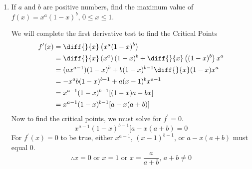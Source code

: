 \documentclass{article}
\begin{document}
\begin{enumerate}[label=\textbf{(13.\arabic*)}]
    \item If $a$ and $b$ are positive numbers, find the maximum value of $f(x)=x^a(1-x)^b$, $0\le x\le 1$.
    
    We will complete the first derivative test to find the Critical Points
\begin{align*}
f^\prime(x)&=\diff{ }{x}\left(x^a(1-x)^b\right) \\
&=\diff{ }{x}\left(x^a\right)(1-x)^b+\diff{ }{x}\left((1-x)^b\right)x^a \\
&=(ax^{a-1})(1-x)^b+b(1-x)^{b-1}\diff{ }{x}(1-x)x^a \\
&=-x^ab(1-x)^{b-1}+a(x-1)^bx^{a-1} \\
&=x^{a-1}(1-x)^{b-1}[(1-x)a-bx] \\
&=x^{a-1}(1-x)^{b-1}[a-x(a+b)] \\
\end{align*}
Now to find the critical points, we must solve for $f^\prime=0$.
\[x^{a-1}(1-x)^{b-1}[a-x(a+b)=0\]
For $f^\prime(x)=0$ to be true, either $x^{a-1}$, $(x-1)^{b-1}$, or $a-x(a+b)$ must equal 0. 
\[\therefore x=0\text{ or }x=1\text{ or }x=\frac{a}{a+b}\text{, }a+b\neq0\]

\end{enumerate}
\end{document}
